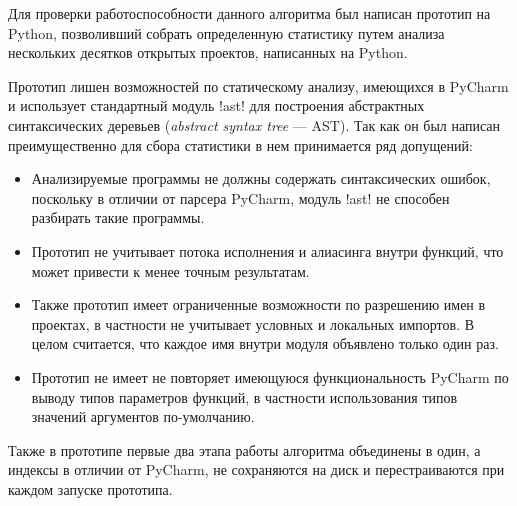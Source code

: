 
Для проверки работоспособности данного алгоритма был написан прототип на
Python, позволивший собрать определенную статистику путем анализа нескольких
десятков открытых проектов, написанных на Python.

Прототип лишен возможностей по статическому анализу, имеющихся в
PyCharm и использует стандартный модуль !ast! для построения абстрактных
синтаксических деревьев (\emph{abstract syntax tree} --- AST). Так как он был
написан преимущественно для сбора статистики в нем принимается ряд допущений:


\begin{itemize}
    \item{%
        Анализируемые программы не должны содержать синтаксических ошибок,
        поскольку в отличии от парсера PyCharm, модуль !ast! не способен
        разбирать такие программы.
      }
    \item{%
        Прототип не учитывает потока исполнения и алиасинга внутри функций, что
        может привести к менее точным результатам.
      }
    \item{%
        Также прототип имеет ограниченные возможности по разрешению имен в проектах, в
        частности не учитывает условных и локальных импортов. В целом считается,
        что каждое имя внутри модуля объявлено только один раз.
      }
    \item{%
        Прототип не имеет не повторяет имеющуюся функциональность PyCharm по
        выводу типов параметров функций, в частности использования типов
        значений аргументов по-умолчанию.
      }
\end{itemize}

Также в прототипе первые два этапа работы алгоритма объединены в один, а индексы
в отличии от PyCharm, не сохраняются на диск и перестраиваются при каждом
запуске прототипа.




